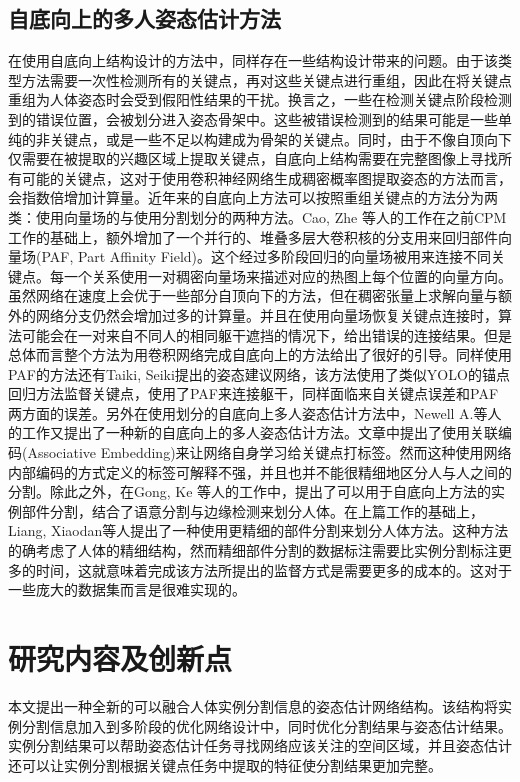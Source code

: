 \subsection{自底向上的多人姿态估计方法}
\label{subsec:bottomup}
在使用自底向上结构设计的方法中，同样存在一些结构设计带来的问题。由于该类型方法需要一次性检测所有的关键点，再对这些关键点进行重组，因此在将关键点重组为人体姿态时会受到假阳性结果的干扰。换言之，一些在检测关键点阶段检测到的错误位置，会被划分进入姿态骨架中。这些被错误检测到的结果可能是一些单纯的非关键点，或是一些不足以构建成为骨架的关键点。同时，由于不像自顶向下仅需要在被提取的兴趣区域上提取关键点，自底向上结构需要在完整图像上寻找所有可能的关键点，这对于使用卷积神经网络生成稠密概率图提取姿态的方法而言，会指数倍增加计算量。近年来的自底向上方法可以按照重组关键点的方法分为两类：使用向量场的与使用分割划分的两种方法。Cao, Zhe 等人的工作\cite{Cao2016Realtime}在之前CPM工作的基础上，额外增加了一个并行的、堆叠多层大卷积核的分支用来回归部件向量场(PAF, Part Affinity Field)。这个经过多阶段回归的向量场被用来连接不同关键点。每一个关系使用一对稠密向量场来描述对应的热图上每个位置的向量方向。虽然网络在速度上会优于一些部分自顶向下的方法，但在稠密张量上求解向量与额外的网络分支仍然会增加过多的计算量。并且在使用向量场恢复关键点连接时，算法可能会在一对来自不同人的相同躯干遮挡的情况下，给出错误的连接结果。但是总体而言整个方法为用卷积网络完成自底向上的方法给出了很好的引导。同样使用PAF的方法还有Taiki, Seiki提出的姿态建议网络\cite{Sekii_2018_ECCV}，该方法使用了类似YOLO的锚点回归方法监督关键点，使用了PAF来连接躯干，同样面临来自关键点误差和PAF两方面的误差。另外在使用划分的自底向上多人姿态估计方法中，Newell A.等人的工作\cite{Newell2017Associative}又提出了一种新的自底向上的多人姿态估计方法。文章中提出了使用关联编码(Associative Embedding)来让网络自身学习给关键点打标签。然而这种使用网络内部编码的方式定义的标签可解释不强，并且也并不能很精细地区分人与人之间的分割。除此之外，在Gong, Ke 等人的工作中\cite{gong2018instance}，提出了可以用于自底向上方法的实例部件分割，结合了语意分割与边缘检测来划分人体。在上篇工作的基础上，Liang, Xiaodan等人提出了一种使用更精细的部件分割来划分人体方法\cite{liang2019look}。这种方法的确考虑了人体的精细结构，然而精细部件分割的数据标注需要比实例分割标注更多的时间，这就意味着完成该方法所提出的监督方式是需要更多的成本的。这对于一些庞大的数据集而言是很难实现的。
\section{研究内容及创新点}
\label{sec:contribution}
本文提出一种全新的可以融合人体实例分割信息的姿态估计网络结构。该结构将实例分割信息加入到多阶段的优化网络设计中，同时优化分割结果与姿态估计结果。实例分割结果可以帮助姿态估计任务寻找网络应该关注的空间区域，并且姿态估计还可以让实例分割根据关键点任务中提取的特征使分割结果更加完整。

